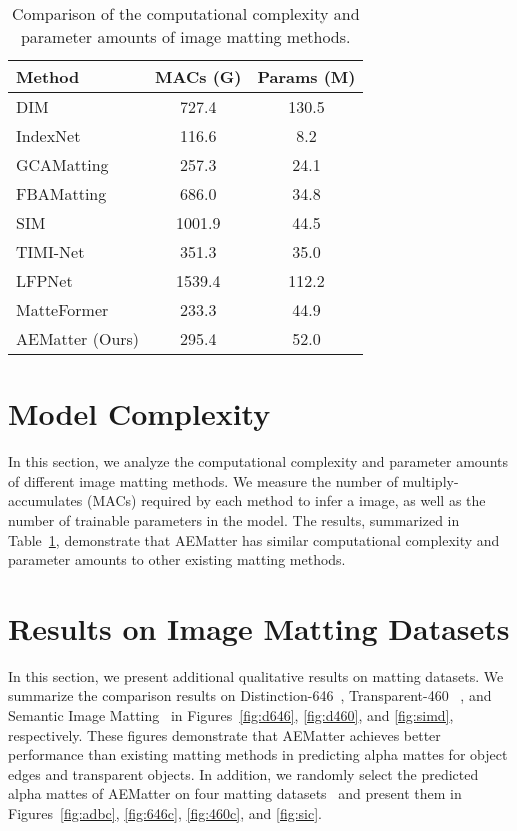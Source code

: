 \documentclass[10pt,twocolumn,letterpaper]{article}
\begin{document}
\begin{table}[!t]
  \centering
  \caption{Comparison of the computational complexity and parameter amounts of image matting methods. }
    \begin{tabular}{l|c|c}
    \toprule
    Method & MACs (G) & Params (M) \\
    \midrule
    DIM~\cite{xu2017deep}   & 727.4 & 130.5  \\
    IndexNet~\cite{lu2019indices} & 116.6 & 8.2  \\
    GCAMatting~\cite{li2020natural} & 257.3 & 24.1  \\
    FBAMatting~\cite{forte2020fbamatting} & 686.0   & 34.8  \\
    SIM~\cite{sun2021sim}   & 1001.9 & 44.5  \\
    TIMI-Net~\cite{Liu_2021_ICCV}  & 351.3 & 35.0  \\
    LFPNet~\cite{liu2021lfpnet} & 1539.4 & 112.2  \\
    MatteFormer~\cite{park2022matteformer} & 233.3 & 44.9  \\
    \midrule
    AEMatter (Ours) & 295.4 & 52.0  \\
    \bottomrule
    \end{tabular}\label{tab:cs}\end{table}\section{Model Complexity}
\label{sec:cc1}
In this section, we analyze the computational complexity and parameter amounts of different image matting methods.
We measure the number of multiply-accumulates (MACs) required by each method to infer a  image, as well as the number of trainable parameters in the model.
The results, summarized in Table~\ref{tab:cs}, demonstrate that AEMatter has similar computational complexity and parameter amounts to other existing matting methods.



\section{Results on Image Matting Datasets}
\label{sec:cc4}
In this section, we present additional qualitative results on matting datasets. 
We summarize the comparison results on Distinction-646~\cite{qiao2020attention}, Transparent-460~
\cite{cai2022TransMatting}, and Semantic Image Matting~\cite{sun2021sim} in Figures~\ref{fig:d646}, \ref{fig:d460}, and \ref{fig:simd}, respectively.
These figures demonstrate that AEMatter achieves better performance than existing matting methods in predicting alpha mattes for object edges and transparent objects.
In addition, we randomly select the predicted alpha mattes of AEMatter on four matting datasets~\cite{xu2017deep,qiao2020attention,cai2022TransMatting,sun2021sim} and present them in Figures~\ref{fig:adbc}, \ref{fig:646c}, \ref{fig:460c}, and \ref{fig:sic}.
\end{document}
